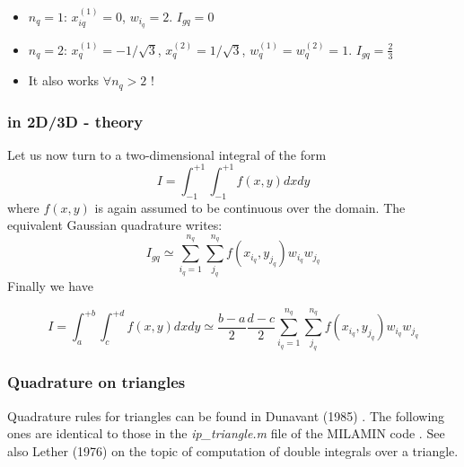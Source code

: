 \begin{itemize}
\item $n_q=1$: $x_{iq}^{(1)}=0$, $w_{i_q}=2$. $I_{gq}=0$
\item $n_q=2$: $x_{q}^{(1)}=-1/\sqrt{3}$, $x_{q}^{(2)}=1/\sqrt{3}$, $w_{q}^{(1)}=w_{q}^{(2)}=1$. $I_{gq}=\frac{2}{3}$
\item It also works $\forall n_q>2$ !
\end{itemize}

\subsubsection{in 2D/3D - theory}

Let us now turn to a two-dimensional integral of the form
\[
I=\int_{-1}^{+1} \int_{-1}^{+1} f(x,y) dx dy
\]
where $f(x,y)$ is again assumed to be continuous over the domain. 
The equivalent Gaussian quadrature writes:
\[
I_{gq}
\simeq \sum_{i_q=1}^{n_q}\sum_{j_q}^{n_q} f(x_{i_q},y_{j_q}) w_{i_q} w_{j_q}
\]
Finally we have 
\begin{mdframed}[backgroundcolor=blue!5]
\begin{equation}
I=\int_{a}^{+b}\int_{c}^{+d} f(x,y) dx dy
\simeq \frac{b-a}{2} \frac{d-c}{2} 
\sum_{i_q=1}^{n_q}\sum_{j_q}^{n_q} f(x_{i_q},y_{j_q}) w_{i_q} w_{j_q}
\end{equation}
\end{mdframed}

\subsubsection{Quadrature on triangles}

Quadrature rules for triangles can be found in Dunavant (1985) \cite{duna85}.
The following ones are identical to those in the {\sl ip\_triangle.m} 
file of the MILAMIN code \cite{daks08}. See also Lether (1976) \cite{leth76}
on the topic of computation of double integrals over a triangle.

